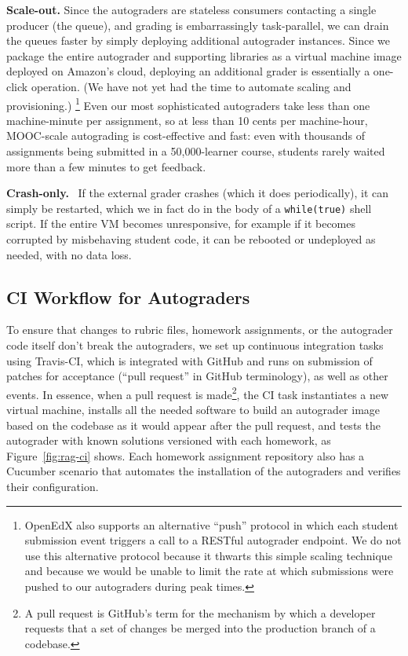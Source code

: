 \textbf{Scale-out.} 
Since the autograders are stateless consumers
contacting a single producer (the queue), and grading is
embarrassingly task-parallel, we can drain the queues faster by simply
deploying additional autograder instances.
Since we package the entire autograder and supporting libraries as a
virtual machine image deployed on Amazon's cloud, deploying an
additional grader is essentially a one-click operation. (We have not
yet had the time to automate scaling and provisioning.)
\footnote{OpenEdX also supports an alternative ``push'' protocol in which each student
submission event triggers a call to a RESTful autograder endpoint.
We do not use this
alternative protocol because it thwarts this simple scaling technique
and because we would be  unable to limit the rate at which
submissions were pushed to our autograders during peak times.}
Even our most sophisticated autograders take less than one
machine-minute per assignment, so at less than 10 cents per machine-hour,
MOOC-scale 
autograding is cost-effective and fast: even with
thousands of assignments being submitted in a 50,000-learner course,
students rarely waited more than a few minutes to get feedback.

\textbf{Crash-only.}~\cite{candea:crash-only}
If the external grader crashes (which it does periodically), it can
simply be restarted, which we in fact do in the
body of a \texttt{while(true)} shell script.
If the entire VM becomes unresponsive, for example if it becomes
corrupted by misbehaving student code, it can be rebooted or
undeployed as needed, with no data loss.

\subsection{CI Workflow for Autograders}

To ensure that changes to rubric files, homework assignments, or the
autograder code itself don't break the autograders, 
we set up continuous integration tasks using Travis-CI, which is integrated with
GitHub and runs on submission of patches for acceptance (``pull request''
in GitHub terminology), as well as other events. 
In essence, when a pull request is made\footnote{A pull request is
  GitHub's term for the mechanism by which a developer requests that a
  set of changes 
  be merged into the production branch of a codebase.},  
the CI task instantiates  a
new virtual 
machine, installs all the needed software to build an autograder image
based on the codebase as it would appear after the pull request,
and tests the autograder with known solutions versioned with each homework, as
Figure~\ref{fig:rag-ci} shows.
Each homework assignment repository also has a Cucumber scenario that
automates the installation of the autograders and verifies their
configuration. 

